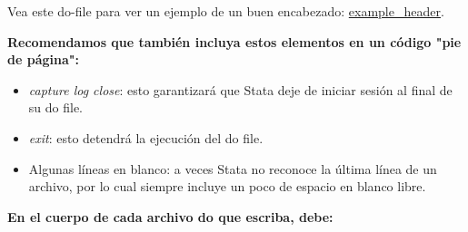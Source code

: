 \documentclass[11pt,en]{elegantpaper}
\begin{document}
Vea este do-file para ver un ejemplo de un buen encabezado: \href{http://www.poverty-action.org/research-transparency/example-header}{example_header}.

\textbf{Recomendamos que también incluya estos elementos en un código "pie de página":}

\begin{itemize}
	\item \textit{capture log close}: esto garantizará que Stata deje de iniciar sesión al final de su do file.
	\item \textit{exit}: esto detendrá la ejecución del do file.
	\item Algunas líneas en blanco: a veces Stata no reconoce la última línea de un archivo, por lo cual siempre incluye un poco de               espacio en blanco libre.
\end{itemize}

\textbf{En el cuerpo de cada archivo do que escriba, debe:}
\end{document}
